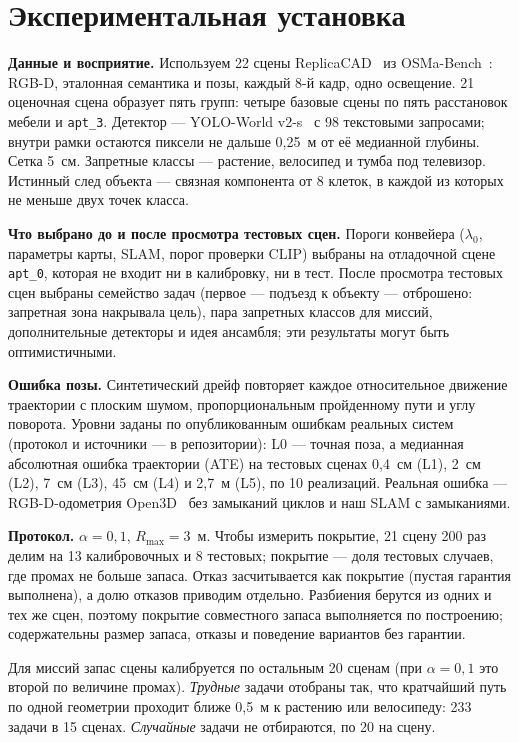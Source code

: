 \documentclass[conference,a4paper]{IEEEtran}
\theoremstyle{definition}
\begin{document}
\section{Экспериментальная установка}\label{sec:setup}

\textbf{Данные и восприятие.} Используем 22 сцены ReplicaCAD~\cite{habitat2} из OSMa-Bench~\cite{osmabench}: RGB-D,
эталонная семантика и позы, каждый 8-й кадр, одно освещение. 21 оценочная сцена образует пять групп: четыре базовые
сцены по пять расстановок мебели и \texttt{apt\_3}. Детектор --- YOLO-World v2-s~\cite{yoloworld} с 98 текстовыми
запросами; внутри рамки остаются пиксели не дальше 0,25~м от её медианной глубины. Сетка 5~см. Запретные классы ---
растение, велосипед и тумба под телевизор. Истинный след объекта --- связная компонента от 8 клеток, в каждой из
которых не меньше двух точек класса.

\textbf{Что выбрано до и после просмотра тестовых сцен.} Пороги конвейера ($\lambda_0$, параметры карты, SLAM, порог
проверки CLIP) выбраны на отладочной сцене \texttt{apt\_0}, которая не входит ни в калибровку, ни в тест. После
просмотра тестовых сцен выбраны семейство задач (первое --- подъезд к объекту --- отброшено: запретная зона накрывала
цель), пара запретных классов для миссий, дополнительные детекторы и идея ансамбля; эти результаты могут быть
оптимистичными.

\textbf{Ошибка позы.} Синтетический дрейф повторяет каждое относительное движение траектории с плоским шумом,
пропорциональным пройденному пути и углу поворота. Уровни заданы по опубликованным ошибкам реальных систем (протокол и
источники --- в репозитории): L0 --- точная поза, а медианная абсолютная ошибка траектории (ATE) на тестовых сценах
0,4~см (L1), 2~см (L2), 7~см (L3), 45~см (L4) и 2,7~м (L5), по 10 реализаций. Реальная ошибка --- RGB-D-одометрия
Open3D~\cite{open3d} без замыканий циклов и наш SLAM с замыканиями.

\textbf{Протокол.} $\alpha = 0{,}1$, $R_{\max} = 3$~м. Чтобы измерить покрытие, 21 сцену 200 раз делим на 13
калибровочных и 8 тестовых; покрытие --- доля тестовых случаев, где промах не больше запаса. Отказ засчитывается как
покрытие (пустая гарантия выполнена), а долю отказов приводим отдельно. Разбиения берутся из одних и тех же сцен,
поэтому покрытие совместного запаса выполняется по построению; содержательны размер запаса, отказы и поведение
вариантов без гарантии.

Для миссий запас сцены калибруется по остальным 20 сценам (при $\alpha = 0{,}1$ это второй по величине промах).
\emph{Трудные} задачи отобраны так, что кратчайший путь по одной геометрии проходит ближе 0,5~м к растению или
велосипеду: 233 задачи в 15 сценах. \emph{Случайные} задачи не отбираются, по 20 на сцену.
\end{document}
